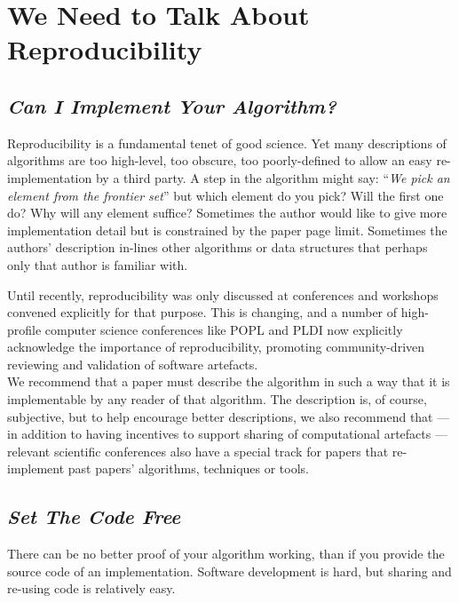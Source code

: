 \documentclass[a4paper,11pt]{article}
\begin{document}
\section{We Need to Talk About Reproducibility}

\subsection{{\emph{Can I Implement Your Algorithm?}}}

Reproducibility is a fundamental tenet of
good science. Yet many descriptions of algorithms are too high-level,
too obscure, too poorly-defined to allow an easy re-implementation by
a third party. A step in the algorithm might say: ``{\emph{We pick an
element from the frontier set}}'' but which element do you pick? Will
the first one do?  Why will any element suffice? Sometimes the author
would like to give more implementation detail but is constrained by
the paper page limit. Sometimes the authors' description in-lines
other algorithms or data structures that perhaps only that author is
familiar with.

Until recently, reproducibility was only discussed at conferences and
workshops convened explicitly for that purpose. This is changing, and
a number of high-profile computer science conferences like POPL and
PLDI now explicitly acknowledge the importance of reproducibility,
promoting community-driven reviewing and validation of software
artefacts. \\

 We recommend that a
paper must describe the algorithm in such a way that it is
implementable by any reader of that algorithm. The description is, of
course, subjective, but to help encourage better descriptions, we also
recommend that --- in addition to having incentives to support sharing
of computational artefacts --- relevant scientific conferences also
have a special track for papers that re-implement past papers'
algorithms, techniques or tools.

\subsection{{\emph{Set The Code Free}}}

There can be no better proof of your algorithm working, than if you
provide the source code of an implementation. Software development is
hard, but sharing and re-using code is relatively easy.
\end{document}
